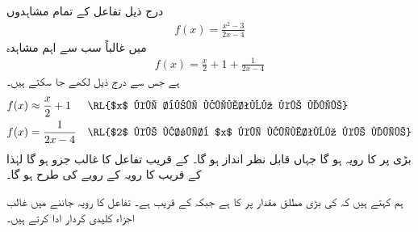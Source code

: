 درج ذیل تفاعل کے تمام مشاہدوں
\begin{align*}
f(x)=\frac{x^2-3}{2x-4}
\end{align*} 
میں غالباً سب سے اہم مشاہدہ
\begin{align*}
f(x)=\frac{x}{2}+1+\frac{1}{2x-4}
\end{align*}
ہے جس سے  درج ذیل لکھے جا سکتے ہیں۔
\begin{align*}
f(x)&\approx \frac{x}{2}+1&&\text{\RL{$x$ کی بڑی قیمتوں کے لیے}}\\
f(x)&=\frac{1}{2x-4}&&\text{\RL{$2$ کے قریب $x$ کی قیمتوں کے لیے}}
\end{align*}
بڑی  پر  کا رویہ  ہو گا جہاں  قابل نظر انداز ہو گا۔  کے قریب   تفاعل  کا غالب جزو ہو گا لہٰذا   کے قریب  کا رویہ  کے رویے کی طرح ہو گا۔ 

ہم کہتے ہیں کہ  کی بڑی مطلق مقدار پر  کا  ہے جبکہ  کے قریب   ہے۔ تفاعل کا رویہ جاننے میں غالب اجزاء کلیدی کردار ادا کرتے ہیں۔ 

